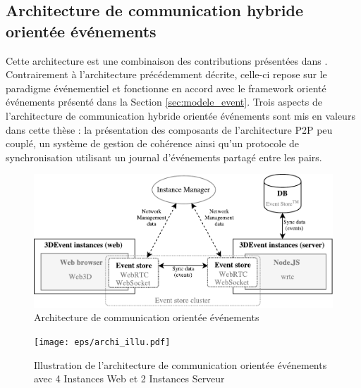 \subsection{Architecture de communication hybride \og orientée 
événements\fg{}}
\label{sec:comm_event}

Cette architecture est une combinaison des contributions présentées dans 
\cite{Desprat2016,Desprat2017}. Contrairement à l'architecture précédemment 
décrite, celle-ci repose sur le paradigme événementiel et fonctionne en accord 
avec le framework orienté événements présenté dans la Section 
\ref{sec:modele_event}. Trois aspects de l'architecture de communication hybride 
orientée événements sont mis en valeurs dans cette thèse : la présentation des 
composants de l'architecture \gls{P2P} peu couplé, un système de gestion de 
cohérence ainsi qu'un protocole de 
synchronisation utilisant un journal d'événements partagé entre les pairs.
 
\begin{figure}[ht]
	\centering
	\includegraphics[width=\columnwidth]{eps/archi.pdf}
	\caption{Architecture de communication \og orientée événements\fg{}}
	\label{fig:archievent}
\end{figure}

\begin{figure}[h]
	\centering
	\texttt{[image: eps/archi\_illu.pdf]}
	\caption{Illustration de l'architecture de communication \og orientée 
	événements\fg{} avec 4 Instances Web et 2 Instances Serveur}
	\label{fig:archi_illu_event}
\end{figure}

